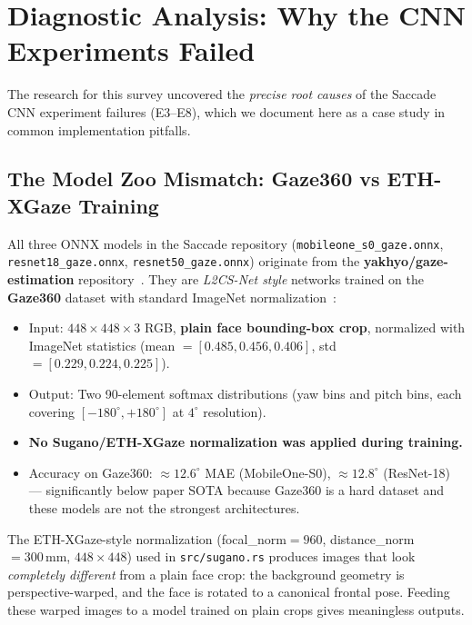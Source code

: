 \documentclass[11pt,a4paper]{article}
\begin{document}
\section{Diagnostic Analysis: Why the CNN Experiments Failed}
\label{sec:diagnosis}

The research for this survey uncovered the \textit{precise root causes} of the Saccade CNN experiment failures (E3--E8), which we document here as a case study in common implementation pitfalls.

\subsection{The Model Zoo Mismatch: Gaze360 vs ETH-XGaze Training}

All three ONNX models in the Saccade repository (\texttt{mobileone\_s0\_gaze.onnx}, \texttt{resnet18\_gaze.onnx}, \texttt{resnet50\_gaze.onnx}) originate from the \textbf{yakhyo/gaze-estimation} repository~\cite{yakhyo_gaze}.
They are \textit{L2CS-Net style} networks trained on the \textbf{Gaze360} dataset with standard ImageNet normalization~\cite{kellnhofer2019gaze360}:

\begin{itemize}
  \item Input: $448\times448\times3$ RGB, \textbf{plain face bounding-box crop}, normalized with ImageNet statistics (mean $= [0.485, 0.456, 0.406]$, std $= [0.229, 0.224, 0.225]$).
  \item Output: Two 90-element softmax distributions (yaw bins and pitch bins, each covering $[-180^\circ, +180^\circ]$ at $4^\circ$ resolution).
  \item \textbf{No Sugano/ETH-XGaze normalization was applied during training.}
  \item Accuracy on Gaze360: $\approx12.6^\circ$ MAE (MobileOne-S0), $\approx12.8^\circ$ (ResNet-18) --- significantly below paper SOTA because Gaze360 is a hard dataset and these models are not the strongest architectures.
\end{itemize}

The ETH-XGaze-style normalization (focal\_norm$=960$, distance\_norm$=300\,\text{mm}$, $448\times448$) used in \texttt{src/sugano.rs} produces images that look \textit{completely different} from a plain face crop: the background geometry is perspective-warped, and the face is rotated to a canonical frontal pose. Feeding these warped images to a model trained on plain crops gives meaningless outputs.
\end{document}
